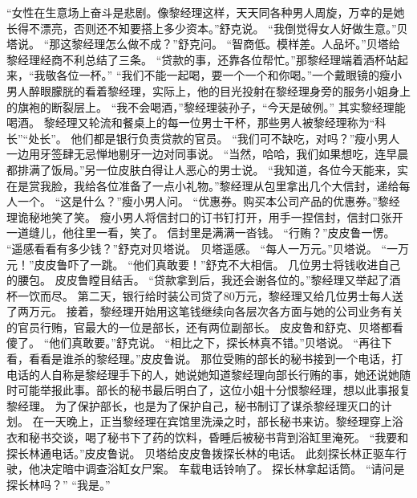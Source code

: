 \documentclass[a4paper,12pt,UTF8,twoside]{ctexbook}
\begin{document}
        “女性在生意场上奋斗是悲剧。像黎经理这样，天天同各种男人周旋，万幸的是她长得不漂亮，否则还不知要搭上多少资本。”舒克说。  
        “我倒觉得女人好做生意。”贝塔说。  
        “那这黎经理怎么做不成？”舒克问。  
        “智商低。模样差。人品坏。”贝塔给黎经理经商不利总结了三条。  
        “贷款的事，还靠各位帮忙。”那黎经理端着酒杯站起来，“我敬各位一杯。”  
        “我们不能一起喝，要一个一个和你喝。”一个戴眼镜的瘦小男人醉眼朦胱的看着黎经理，实际上，他的目光投射在黎经理身旁的服务小姐身上的旗袍的断裂层上。  
        “我不会喝酒，”黎经理装孙子，“今天是破例。”  
        其实黎经理能喝酒。  
        黎经理又轮流和餐桌上的每一位男士干杯，那些男人被黎经理称为“科长”“处长”。  
        他们都是银行负责贷款的官员。  
        “我们可不缺吃，对吗？”瘦小男人一边用牙签肆无忌惮地剔牙一边对同事说。  
        “当然，哈哈，我们如果想吃，连早晨都排满了饭局。”另一位皮肤白得让人恶心的男士说。  
        “我知道，各位今天能来，实在是赏我脸，我给各位准备了一点小礼物。”黎经理从包里拿出几个大信封，递给每人一个。  
        “这是什么？”瘦小男人问。  
        “优惠券。购买本公司产品的优惠券。”黎经理诡秘地笑了笑。  
        瘦小男人将信封口的订书钉打开，用手一捏信封，信封口张开一道缝儿，他往里一看，笑了。  
        信封里是满满一沓钱。  
        “行贿？”皮皮鲁一愣。  
        “遥感看看有多少钱？”舒克对贝塔说。  
        贝塔遥感。  
        “每人一万元。”贝塔说。        
        “一万元！”皮皮鲁吓了一跳。  
        “他们真敢要！”舒克不大相信。  
        几位男士将钱收进自己的腰包。  
        皮皮鲁瞠目结舌。  
        “贷款拿到后，我还会谢各位的。”黎经理又举起了酒杯一饮而尽。  
        第二天，银行给时装公司贷了80万元，黎经理又给几位男士每人送了两万元。  
        接着，黎经理开始用这笔钱继续向各层次各方面与她的公司业务有关的官员行贿，官最大的一位是部长，还有两位副部长。  
        皮皮鲁和舒克、贝塔都看傻了。  
        “他们真敢要。”舒克说。  
        “相比之下，探长林真不错。”贝塔说。  
        “再往下看，看看是谁杀的黎经理。”皮皮鲁说。  
        那位受贿的部长的秘书接到一个电话，打电话的人自称是黎经理手下的人，她说她知道黎经理向部长行贿的事，她还说她随时可能举报此事。部长的秘书最后明白了，这位小姐十分恨黎经理，想以此事报复黎经理。  
        为了保护部长，也是为了保护自己，秘书制订了谋杀黎经理灭口的计划。  
        在一天晚上，正当黎经理在宾馆里洗澡之时，部长秘书来访。黎经理穿上浴衣和秘书交谈，喝了秘书下了药的饮料，昏睡后被秘书背到浴缸里淹死。  
        “我要和探长林通电话。”皮皮鲁说。  
        贝塔给皮皮鲁拨探长林的电话。  
        此刻探长林正驱车行驶，他决定暗中调查浴缸女尸案。  
        车载电话铃响了。  
        探长林拿起话筒。  
        “请问是探长林吗？”  
        “我是。”  
\end{document}

